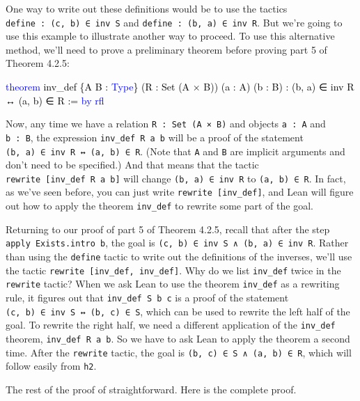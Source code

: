 \documentclass[
  letterpaper,
  DIV=11,
  numbers=noendperiod]{scrreprt}
\newenvironment{Shaded}{\begin{snugshade}}{\end{snugshade}}
\newcommand{\KeywordTok}[1]{\textcolor[rgb]{0.00,0.23,0.31}{#1}}
\newcommand{\NormalTok}[1]{\textcolor[rgb]{0.00,0.23,0.31}{#1}}
\renewcommand{\NormalTok}[1]{\textcolor[HTML]{000000}{#1}}
\renewcommand{\KeywordTok}[1]{\textcolor[HTML]{0000FF}{#1}}
\theoremstyle{remark}
\begin{document}
One way to write out these definitions would be to use the tactics
\texttt{define\ :\ (c,\ b)\ ∈\ inv\ S} and
\texttt{define\ :\ (b,\ a)\ ∈\ inv\ R}. But we're going to use this
example to illustrate another way to proceed. To use this alternative
method, we'll need to prove a preliminary theorem before proving part 5
of Theorem 4.2.5:

\begin{Shaded}
\begin{Highlighting}[]
\KeywordTok{theorem}\NormalTok{ inv\_def \{A B : }\KeywordTok{Type}\NormalTok{\} (R : Set (A × B)) (a : A) (b : B) :}
\NormalTok{    (b, a) ∈ inv R ↔ (a, b) ∈ R := }\KeywordTok{by} \KeywordTok{rfl}
\end{Highlighting}
\end{Shaded}

Now, any time we have a relation \texttt{R\ :\ Set\ (A\ ×\ B)} and
objects \texttt{a\ :\ A} and \texttt{b\ :\ B}, the expression
\texttt{inv\_def\ R\ a\ b} will be a proof of the statement
\texttt{(b,\ a)\ ∈\ inv\ R\ ↔\ (a,\ b)\ ∈\ R}. (Note that \texttt{A} and
\texttt{B} are implicit arguments and don't need to be specified.) And
that means that the tactic \texttt{rewrite\ {[}inv\_def\ R\ a\ b{]}}
will change \texttt{(b,\ a)\ ∈\ inv\ R} to \texttt{(a,\ b)\ ∈\ R}. In
fact, as we've seen before, you can just write
\texttt{rewrite\ {[}inv\_def{]}}, and Lean will figure out how to apply
the theorem \texttt{inv\_def} to rewrite some part of the goal.

Returning to our proof of part 5 of Theorem 4.2.5, recall that after the
step \texttt{apply\ Exists.intro\ b}, the goal is
\texttt{(c,\ b)\ ∈\ inv\ S\ ∧\ (b,\ a)\ ∈\ inv\ R}. Rather than using
the \texttt{define} tactic to write out the definitions of the inverses,
we'll use the tactic \texttt{rewrite\ {[}inv\_def,\ inv\_def{]}}. Why do
we list \texttt{inv\_def} twice in the \texttt{rewrite} tactic? When we
ask Lean to use the theorem \texttt{inv\_def} as a rewriting rule, it
figures out that \texttt{inv\_def\ S\ b\ c} is a proof of the statement
\texttt{(c,\ b)\ ∈\ inv\ S\ ↔\ (b,\ c)\ ∈\ S}, which can be used to
rewrite the left half of the goal. To rewrite the right half, we need a
different application of the \texttt{inv\_def} theorem,
\texttt{inv\_def\ R\ a\ b}. So we have to ask Lean to apply the theorem
a second time. After the \texttt{rewrite} tactic, the goal is
\texttt{(b,\ c)\ ∈\ S\ ∧\ (a,\ b)\ ∈\ R}, which will follow easily from
\texttt{h2}.

The rest of the proof of straightforward. Here is the complete proof.
\end{document}
